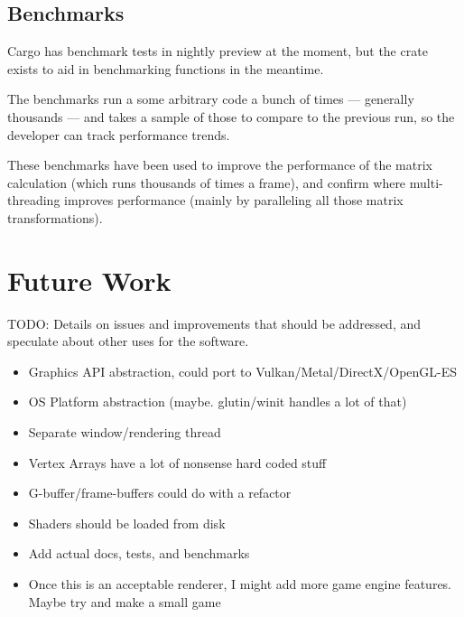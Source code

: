 \subsection{Benchmarks}
Cargo has benchmark tests in nightly preview at the moment, but the  crate exists to aid in benchmarking functions in the meantime.

The benchmarks run a some arbitrary code a bunch of times — generally thousands — and takes a sample of those to compare to the previous run, so the developer can track performance trends.

These benchmarks have been used to improve the performance of the  matrix calculation (which runs thousands of times a frame), and confirm where multi-threading improves performance (mainly by paralleling all those matrix transformations).

\section{Future Work}

TODO: Details on issues and improvements that should be addressed, and speculate about other uses for the software.

\begin{itemize}
  \item Graphics API abstraction, could port to Vulkan/Metal/DirectX/OpenGL-ES
  \item OS Platform abstraction (maybe. glutin/winit handles a lot of that)
  \item Separate window/rendering thread
  \item Vertex Arrays have a lot of nonsense hard coded stuff
  \item G-buffer/frame-buffers could do with a refactor
  \item Shaders should be loaded from disk
  \item Add actual docs, tests, and benchmarks
  \item Once this is an acceptable renderer, I might add more game engine features. Maybe try and make a small game
\end{itemize}

\newpage


\printbibliography[heading=bibintoc]{}

